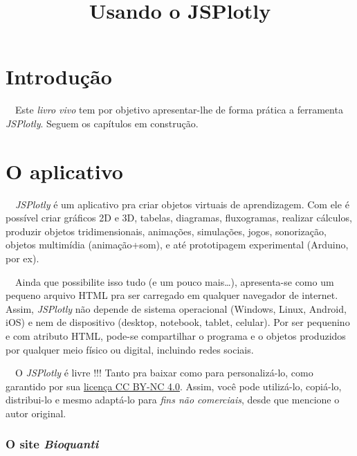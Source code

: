 \documentclass[
  portuguese,
  letterpaper,
  DIV=11,
  numbers=noendperiod]{scrreprt}
\title{Usando o JSPlotly}
\author{}
\date{}
\renewcommand*\contentsname{Índice}
\newcommand\contentsname{Índice}
\begin{document}
\maketitle

\renewcommand*\contentsname{Índice}
{
\hypersetup{linkcolor=}
\setcounter{tocdepth}{2}
\tableofcontents
}


\chapter{Introdução}\label{introduuxe7uxe3o}

~~Este \emph{livro vivo} tem por objetivo apresentar-lhe de forma
prática a ferramenta \emph{JSPlotly}. Seguem os capítulos em construção.


\chapter{O aplicativo}\label{o-aplicativo}

~~\emph{JSPlotly} é um aplicativo pra criar objetos virtuais de
aprendizagem. Com ele é possível criar gráficos 2D e 3D, tabelas,
diagramas, fluxogramas, realizar cálculos, produzir objetos
tridimensionais, animações, simulações, jogos, sonorização, objetos
multimídia (animação+som), e até prototipagem experimental (Arduino, por
ex).

~~Ainda que possibilite isso tudo (e um pouco mais\ldots), apresenta-se
como um pequeno arquivo HTML pra ser carregado em qualquer navegador de
internet. Assim, \emph{JSPlotly} não depende de sistema operacional
(Windows, Linux, Android, iOS) e nem de dispositivo (desktop, notebook,
tablet, celular). Por ser pequenino e com atributo HTML, pode-se
compartilhar o programa e o objetos produzidos por qualquer meio físico
ou digital, incluindo redes sociais.

~~O \emph{JSPlotly} é livre !!! Tanto pra baixar como para
personalizá-lo, como garantido por sua
\href{https://creativecommons.org/licenses/by-nc/4.0/}{licença CC BY-NC
4.0}. Assim, você pode utilizá-lo, copiá-lo, distribui-lo e mesmo
adaptá-lo para \emph{fins não comerciais}, desde que mencione o autor
original.

\subsection{\texorpdfstring{O site
\emph{Bioquanti}}{O site Bioquanti}}\label{o-site-bioquanti}
\end{document}
